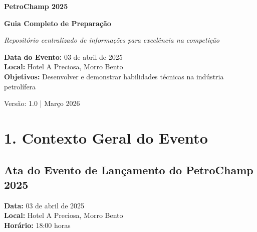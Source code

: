 \documentclass[11pt,a4paper]{article}
\begin{document}
\begin{center}
\vspace*{3cm}

{\Huge\textbf{\textcolor{accent}{PetroChamp 2025}}}

\vspace{1cm}

{\LARGE\textbf{\textcolor{darkmain}{Guia Completo de Preparação}}}

\vspace{2cm}

{\large\textit{Repositório centralizado de informações para excelência na competição}}

\vspace{3cm}

\begin{tcolorbox}[colback=petroblue!10, colframe=petroblue, boxrule=2pt]
\textbf{Data do Evento:} 03 de abril de 2025\\
\textbf{Local:} Hotel A Preciosa, Morro Bento\\
\textbf{Objetivos:} Desenvolver e demonstrar habilidades técnicas na indústria petrolífera
\end{tcolorbox}

\vspace{3cm}

{\normalsize Versão: 1.0 | Março 2026}

\end{center}

\newpage

\tableofcontents
\newpage

\section*{1. Contexto Geral do Evento}

\subsection*{Ata do Evento de Lançamento do PetroChamp 2025}

\begin{tcolorbox}
\textbf{Data:} 03 de abril de 2025\\
\textbf{Local:} Hotel A Preciosa, Morro Bento\\
\textbf{Horário:} 18:00 horas
\end{tcolorbox}
\end{document}
